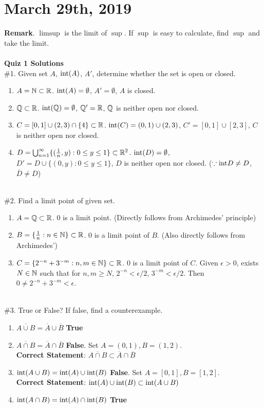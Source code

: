 \section*{March 29th, 2019}
\textbf{Remark}. $\limsup$ is the limit of $\sup$. If $\sup$ is easy to calculate, find $\sup$ and take the limit.\\\\
\textbf{Quiz 1 Solutions}\\
\#1. Given set $A$, $\mathrm{int}(A)$, $A'$, determine whether the set is open or closed.
\begin{enumerate}
	\item $A = \mathbb{N}\subset \mathbb{R}$. $\mathrm{int}(A) = \emptyset$, $A' = \emptyset$, $A$ is closed.
	\item $\mathbb{Q} \subset \mathbb{R}$. $\mathrm{int}(\mathbb{Q}) = \emptyset$, $\mathbb{Q}' = \mathbb{R}$, $\mathbb{Q}$ is neither open nor closed.
	\item $C = [0, 1]\cup (2, 3)\cap \{4\}\subset \mathbb{R}$. $\mathrm{int}(C) = (0, 1)\cup (2, 3)$, $C' = [0, 1]\cup [2, 3]$, $C$ is neither open nor closed.
	\item $D = \bigcup_{n=1}^\infty \{(\frac{1}{n}, y) : 0\leq y\leq 1 \}\subset \mathbb{R}^2$. $\mathrm{int}(D) = \emptyset$, $D'=D\cup \{(0, y) :0\leq y\leq 1 \}$, $D$ is neither open nor closed. ($\because \mathrm{int} D \neq D$, $\overline{D}\neq D$)
\end{enumerate}~\\
\#2. Find a limit point of given set.
\begin{enumerate}
	\item $A = \mathbb{Q}\subset\mathbb{R}$. $0$ is a limit point. (Directly follows from Archimedes' principle)
	\item $B = \{\frac{1}{n}: n\in \mathbb{N} \}\subset\mathbb{R}$. $0$ is a limit point of $B$. (Also directly follows from Archimedes')
	\item $C = \{2^{-n} + 3^{-m}: n, m\in \mathbb{N} \} \subset \mathbb{R}$. $0$ is a limit point of $C$. Given $\epsilon > 0$, exists $N\in \mathbb{N}$ such that for $n, m\geq N$, $2^{-n} < \epsilon/2$, $3^{-m} < \epsilon / 2$. Then $0\neq 2^{-n} + 3^{-m} < \epsilon$.
\end{enumerate}~\\
\#3. True or False? If false, find a counterexample.
\begin{enumerate}
	\item $\overline{A\cup B} = \overline{A} \cup \overline{B}$ \textbf{True}
	\item $ \overline{A\cap B} = \overline{A} \cap \overline{B} $ \textbf{False}. Set $A = (0, 1), B = (1, 2)$. \\\textbf{Correct Statement}: $ \overline{A\cap B} \subset \overline{A} \cap \overline{B}$
	\item $ \mathrm{int}(A\cup B) = \mathrm{int}(A) \cup \mathrm{int}(B) $ \textbf{False}. Set $A = [0, 1], B = [1, 2]$. \\\textbf{Correct Statement}: $\mathrm{int}(A) \cup \mathrm{int}(B) \subset \mathrm{int}(A\cup B)$
	\item $ \mathrm{int}(A\cap B) = \mathrm{int}(A) \cap \mathrm{int}(B) $ \textbf{True}
\end{enumerate}

